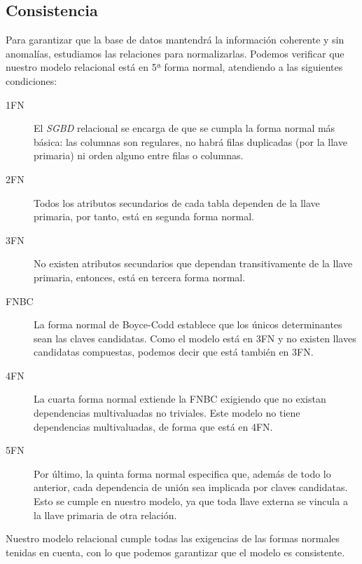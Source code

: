 \smallskip

\subsection{Consistencia}

Para garantizar que la base de datos mantendrá la información coherente y sin anomalías, estudiamos las relaciones para normalizarlas. Podemos verificar que nuestro modelo relacional está en 5ª forma normal, atendiendo a las siguientes condiciones:

\begin{description}
	\item[1FN] El \textit{SGBD} relacional se encarga de que se cumpla la forma normal más básica: las columnas son regulares, no habrá filas duplicadas (por la llave primaria) ni orden alguno entre filas o columnas.
	\item[2FN] Todos los atributos secundarios de cada tabla dependen de la llave primaria, por tanto, está en segunda forma normal.
	\item[3FN] No existen atributos secundarios que dependan transitivamente de la llave primaria, entonces, está en tercera forma normal.
	\item[FNBC] La forma normal de Boyce-Codd establece que los únicos determinantes sean las claves candidatas. Como el modelo está en 3FN y no existen llaves candidatas compuestas, podemos decir que está también en 3FN.
	\item[4FN] La cuarta forma normal extiende la FNBC exigiendo que no existan dependencias multivaluadas no triviales. Este modelo no tiene dependencias multivaluadas, de forma que está en 4FN.
	\item[5FN] Por último, la quinta forma normal especifica que, además de todo lo anterior, cada dependencia de unión sea implicada por claves candidatas. Esto se cumple en nuestro modelo, ya que toda llave externa se vincula a la llave primaria de otra relación.
\end{description}

Nuestro modelo relacional cumple todas las exigencias de las formas normales tenidas en cuenta, con lo que podemos garantizar que el modelo es consistente.

\smallskip

